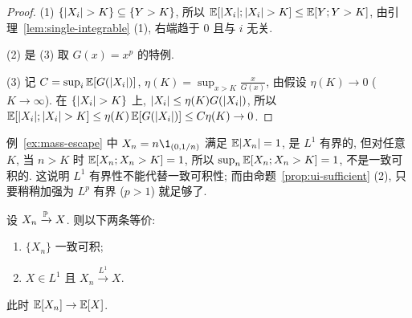 \begin{proof}
(1) $\{\abs{X_i}>K\}\subseteq\{Y>K\}$, 所以 $\E[\abs{X_i};\abs{X_i}>K]\le\E[Y;Y>K]$, 由引理~\ref{lem:single-integrable} (1), 右端趋于 $0$ 且与 $i$ 无关.

(2) 是 (3) 取 $G(x)=x^p$ 的特例.

(3) 记 $C=\sup_i\E[G(\abs{X_i})]$, $\eta(K)=\sup_{x>K}\frac{x}{G(x)}$, 由假设 $\eta(K)\to0$ ($K\to\infty$). 在 $\{\abs{X_i}>K\}$ 上, $\abs{X_i}\le\eta(K)G(\abs{X_i})$, 所以
$\E[\abs{X_i};\abs{X_i}>K]\le\eta(K)\,\E[G(\abs{X_i})]\le C\eta(K)\to0$.
\end{proof}

\begin{example}
例~\ref{ex:mass-escape} 中 $X_n=n\1_{(0,1/n)}$ 满足 $\E\abs{X_n}=1$, 是 $L^1$ 有界的, 但对任意 $K$, 当 $n>K$ 时 $\E[X_n;X_n>K]=1$, 所以 $\sup_n\E[X_n;X_n>K]=1$, 不是一致可积的. 这说明 $L^1$ 有界性不能代替一致可积性; 而由命题~\ref{prop:ui-sufficient} (2), 只要稍稍加强为 $L^p$ 有界 ($p>1$) 就足够了.
\end{example}

\begin{theorem}\label{thm:vitali}
设 $X_n\xrightarrow{\P}X$. 则以下两条等价:
\begin{enumerate}
\item $\{X_n\}$ 一致可积;
\item $X\in L^1$ 且 $X_n\xrightarrow{L^1}X$.
\end{enumerate}
此时 $\E[X_n]\to\E[X]$.
\end{theorem}

